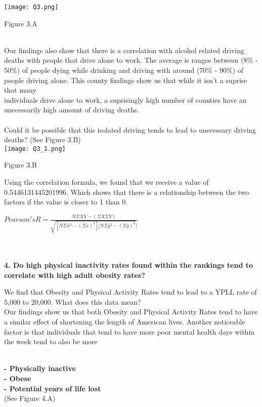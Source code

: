 \documentclass[conference]{IEEEtran}
\begin{document}
\texttt{[image: Q3.png]}
\begin{center}
\footnotesize{Figure 3.A}    
\end{center}

\\Our findings also show that there is a correlation with alcohol related driving deaths with people that drive alone to work.
The average is ranges between (8\% - 50\%) of people dying while drinking and driving with around (70\% - 90\%) of people driving alone.
This county findings show us that while it isn't a suprise that many \\individuals drive alone to work, a suprisingly high number of counties have an unecessarily high amount of driving deaths.\\
\\
Could it be possible that this isolated driving tends to lead to unecessary driving deaths? (See Figure 3.B)\\


\texttt{[image: Q3\_1.png]}
\begin{center}
\footnotesize{Figure 3.B}    
\end{center}


Using the correlation formula, we found that 
we receive a value of 0.5446131445201996.
Which shows that there is a relationship between the two factors if the value
is closer to 1 than 0.\\

\begin{center}
\large{
$ Pearson's R = \frac{N\Sigma{XY}-(\Sigma{X}\Sigma{Y})}{\sqrt{ [N \Sigma{x^2}-(\Sigma{x})^2 ][N \Sigma{y^2}-(\Sigma{y})^2 }]} $
}
\end{center}\\\\

\textbf{4. Do high physical inactivity rates found within the rankings tend to correlate with high adult obesity rates?}

We find that Obesity and Physical Activity Rates tend to lead to
a YPLL rate of 5,000 to 20,000.
What does this data mean? \\
Our findings show us that both Obesity and Physical Activity
Rates tend to have a similar effect of shortening the length
of American lives.
Another noticeable factor is that individuals that tend to have more poor mental health days within the week tend to also be more

\textbf{
\\- Physically inactive
\\- Obese
\\- Potential years of life lost
}\\
(See Figure 4.A)\\
\end{document}
